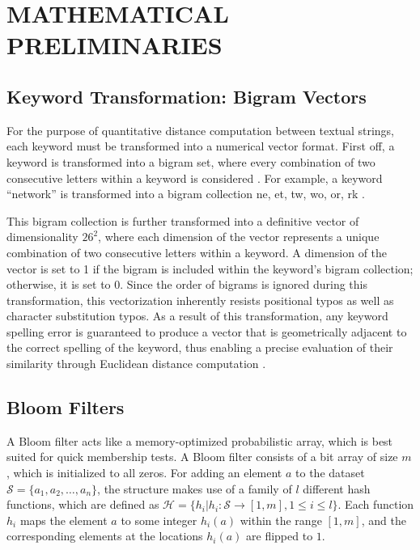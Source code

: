 \chapter{MATHEMATICAL PRELIMINARIES}
\graphicspath{{Chapter3/}}

\section{Keyword Transformation: Bigram Vectors}
For the purpose of quantitative distance computation between textual strings, each keyword must be transformed into a numerical vector format. First off, a keyword is transformed into a bigram set, where every combination of two consecutive letters within a keyword is considered \cite{wang2014privacy}.%
For example, a keyword “network” is transformed into a bigram collection {ne, et, tw, wo, or, rk} \cite{wang2014privacy}.%

This bigram collection is further transformed into a definitive vector of dimensionality $26^2$, where each dimension of the vector represents a unique combination of two consecutive letters within a keyword.%
A dimension of the vector is set to 1 if the bigram is included within the keyword's bigram collection; otherwise, it is set to 0.%
Since the order of bigrams is ignored during this transformation, this vectorization inherently resists positional typos as well as character substitution typos.%
As a result of this transformation, any keyword spelling error is guaranteed to produce a vector that is geometrically adjacent to the correct spelling of the keyword, thus enabling a precise evaluation of their similarity through Euclidean distance computation \cite{wang2014privacy}.%

\section{Bloom Filters}
% 
A Bloom filter acts like a memory-optimized probabilistic array, which is best suited for quick membership tests. A Bloom filter consists of a bit array of size $m$, which is initialized to all zeros. For adding an element $a$ to the dataset $\mathcal{S} = \{a_1, a_2, \dots, a_n\}$, the structure makes use of a family of $l$ different hash functions, which are defined as $\mathcal{H} = \{h_i | h_i : \mathcal{S} \rightarrow [1, m], 1 \le i \le l\}$. Each function $h_i$ maps the element $a$ to some integer $h_i(a)$ within the range $[1, m]$, and the corresponding elements at the locations $h_i(a)$ are flipped to $1$.

